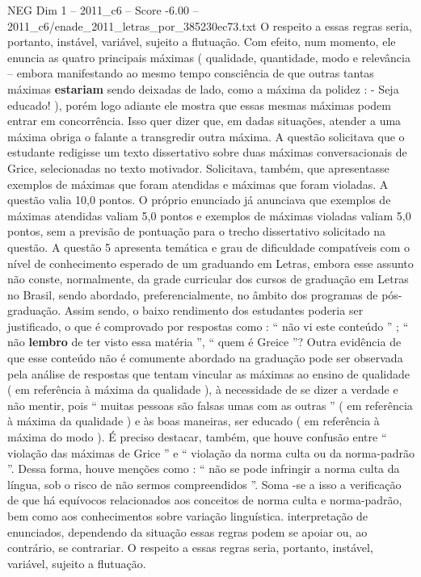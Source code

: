 \begin{textsample}{NEG Dim 1 – 2011\_c6 – Score -6.00 – 2011\_c6/enade\_2011\_letras\_por\_385230ec73.txt}
O respeito a essas regras seria, portanto, instável, variável, sujeito a flutuação.
Com efeito, num momento, ele enuncia as quatro principais máximas ( qualidade, quantidade, modo e relevância – embora manifestando ao mesmo tempo consciência de que outras tantas máximas \textbf{estariam} sendo deixadas de lado, como a máxima da polidez : - Seja educado! ), porém logo adiante ele mostra que essas mesmas máximas podem entrar em concorrência.
Isso quer dizer que, em dadas situações, atender a uma máxima obriga o falante a transgredir outra máxima.
A questão solicitava que o estudante redigisse um texto dissertativo sobre duas máximas conversacionais de Grice, selecionadas no texto motivador.
Solicitava, também, que apresentasse exemplos de máximas que foram atendidas e máximas que foram violadas.
A questão valia 10,0 pontos.
O próprio enunciado já anunciava que exemplos de máximas atendidas valiam 5,0 pontos e exemplos de máximas violadas valiam 5,0 pontos, sem a previsão de pontuação para o trecho dissertativo solicitado na questão.
A questão 5 apresenta temática e grau de dificuldade compatíveis com o nível de conhecimento esperado de um graduando em Letras, embora esse assunto não conste, normalmente, da grade curricular dos cursos de graduação em Letras no Brasil, sendo abordado, preferencialmente, no âmbito dos programas de pós-graduação.
Assim sendo, o baixo rendimento dos estudantes poderia ser justificado, o que é comprovado por respostas como : “ não vi este conteúdo ” ; “ não \textbf{lembro} de ter visto essa matéria ”, “ quem é Greice ”?
Outra evidência de que esse conteúdo não é comumente abordado na graduação pode ser observada pela análise de respostas que tentam vincular as máximas ao ensino de qualidade ( em referência à máxima da qualidade ), à necessidade de se dizer a verdade e não mentir, pois “ muitas pessoas são falsas umas com as outras ” ( em referência à máxima da qualidade ) e às boas maneiras, ser educado ( em referência à máxima do modo ).
É preciso destacar, também, que houve confusão entre “ violação das máximas de Grice ” e “ violação da norma culta ou da norma-padrão ”.
Dessa forma, houve menções como : “ não se pode infringir a norma culta da língua, sob o risco de não sermos compreendidos ”.
Soma -se a isso a verificação de que há equívocos relacionados aos conceitos de norma culta e norma-padrão, bem como aos conhecimentos sobre variação linguística. interpretação de enunciados, dependendo da situação essas regras podem se apoiar ou, ao contrário, se contrariar.
O respeito a essas regras seria, portanto, instável, variável, sujeito a flutuação.

\end{textsample}
